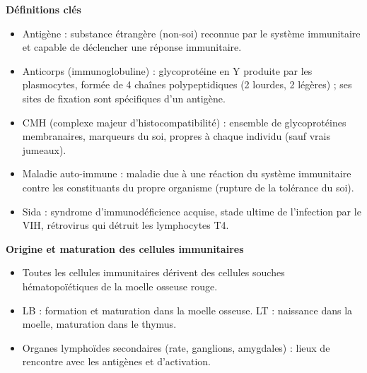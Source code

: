 \documentclass[11pt]{article}
\newcommand{\cle}[1]{{\popxbold\color{popdark}#1}}
\begin{document}
\begin{bilan}
\textbf{Définitions clés}
\begin{itemize}
  \item \cle{Antigène} : substance étrangère (non-soi) reconnue par le système immunitaire et capable de déclencher une réponse immunitaire.
  \item \cle{Anticorps} (immunoglobuline) : glycoprotéine en Y produite par les plasmocytes, formée de 4 chaînes polypeptidiques (2 lourdes, 2 légères) ; ses sites de fixation sont spécifiques d'un antigène.
  \item \cle{CMH} (complexe majeur d'histocompatibilité) : ensemble de glycoprotéines membranaires, marqueurs du \cle{soi}, propres à chaque individu (sauf vrais jumeaux).
  \item \cle{Maladie auto-immune} : maladie due à une réaction du système immunitaire contre les constituants du propre organisme (rupture de la tolérance du soi).
  \item \cle{Sida} : syndrome d'immunodéficience acquise, stade ultime de l'infection par le \cle{VIH}, rétrovirus qui détruit les lymphocytes T4.
\end{itemize}

\textbf{Origine et maturation des cellules immunitaires}
\begin{itemize}
  \item Toutes les cellules immunitaires dérivent des \cle{cellules souches hématopoïétiques} de la moelle osseuse rouge.
  \item \cle{LB} : formation et maturation dans la moelle osseuse. \cle{LT} : naissance dans la moelle, maturation dans le \cle{thymus}.
  \item Organes lymphoïdes secondaires (rate, ganglions, amygdales) : lieux de rencontre avec les antigènes et d'activation.
\end{itemize}


\end{bilan}
\end{document}

